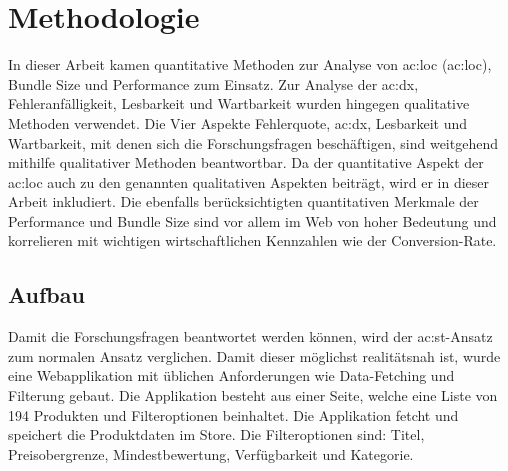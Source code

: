 \chapter{Methodologie}


In dieser Arbeit kamen quantitative Methoden zur Analyse von \acrlong{ac:loc} (\acrshort{ac:loc}), Bundle Size und Performance zum Einsatz. Zur Analyse der \acrlong{ac:dx}, Fehleranfälligkeit, Lesbarkeit und Wartbarkeit wurden hingegen qualitative Methoden verwendet. Die Vier Aspekte Fehlerquote, \acrshort{ac:dx}, Lesbarkeit und Wartbarkeit, mit denen sich die Forschungsfragen beschäftigen, sind weitgehend mithilfe qualitativer Methoden beantwortbar. Da der quantitative Aspekt der \acrshort{ac:loc} auch zu den genannten qualitativen Aspekten beiträgt, wird er in dieser Arbeit inkludiert. Die ebenfalls berücksichtigten quantitativen Merkmale der Performance und Bundle Size sind vor allem im Web von hoher Bedeutung und korrelieren mit wichtigen wirtschaftlichen Kennzahlen wie der Conversion-Rate.\cite{googleConversionRateSpeed}


\section{Aufbau}

Damit die Forschungsfragen beantwortet werden können, wird der \acrshort{ac:st}-Ansatz zum normalen Ansatz verglichen. Damit dieser möglichst realitätsnah ist, wurde eine Webapplikation mit üblichen Anforderungen wie Data-Fetching und Filterung gebaut. Die Applikation besteht aus einer Seite, welche eine Liste von 194 Produkten und Filteroptionen beinhaltet. Die Applikation fetcht und speichert die Produktdaten im Store. Die Filteroptionen sind: Titel, Preisobergrenze, Mindestbewertung, Verfügbarkeit und Kategorie.

